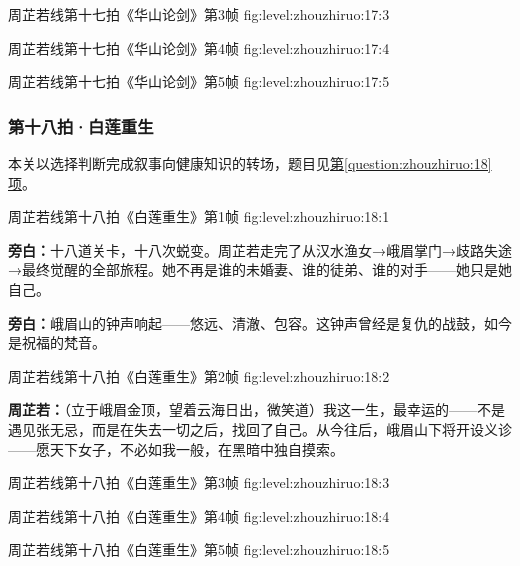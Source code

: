   {周芷若线第十七拍《华山论剑》第3帧}
  {fig:level:zhouzhiruo:17:3}
  {\scriptsize}
  {\mbox{}}

  {周芷若线第十七拍《华山论剑》第4帧}
  {fig:level:zhouzhiruo:17:4}
  {\scriptsize}
  {\mbox{}}

\clearpage

  {周芷若线第十七拍《华山论剑》第5帧}
  {fig:level:zhouzhiruo:17:5}
  {\scriptsize}
  {\mbox{}}

\subsubsection{第十八拍·白莲重生}\label{plot:zhouzhiruo:18}
本关以选择判断完成叙事向健康知识的转场，题目见\hyperref[question:zhouzhiruo:18]{第\ref*{question:zhouzhiruo:18}项}。

  {周芷若线第十八拍《白莲重生》第1帧}
  {fig:level:zhouzhiruo:18:1}
  {\scriptsize}
  {\textbf{旁白：}十八道关卡，十八次蜕变。周芷若走完了从汉水渔女→峨眉掌门→歧路失途→最终觉醒的全部旅程。她不再是谁的未婚妻、谁的徒弟、谁的对手——她只是她自己。\par
\textbf{旁白：}峨眉山的钟声响起——悠远、清澈、包容。这钟声曾经是复仇的战鼓，如今是祝福的梵音。\par}

  {周芷若线第十八拍《白莲重生》第2帧}
  {fig:level:zhouzhiruo:18:2}
  {\scriptsize}
  {\textbf{周芷若：}（立于峨眉金顶，望着云海日出，微笑道）我这一生，最幸运的——不是遇见张无忌，而是在失去一切之后，找回了自己。从今往后，峨眉山下将开设义诊——愿天下女子，不必如我一般，在黑暗中独自摸索。\par}

\clearpage

  {周芷若线第十八拍《白莲重生》第3帧}
  {fig:level:zhouzhiruo:18:3}
  {\scriptsize}
  {\mbox{}}

  {周芷若线第十八拍《白莲重生》第4帧}
  {fig:level:zhouzhiruo:18:4}
  {\scriptsize}
  {\mbox{}}

  {周芷若线第十八拍《白莲重生》第5帧}
  {fig:level:zhouzhiruo:18:5}
  {\scriptsize}
  {\mbox{}}

